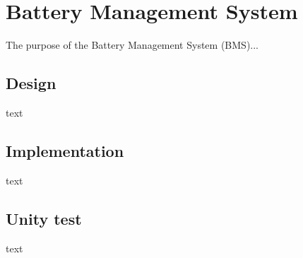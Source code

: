 \section{Battery Management System}
The purpose of the Battery Management System (BMS)...

\subsection{Design}
text

\subsection{Implementation}
text

\subsection{Unity test}
text